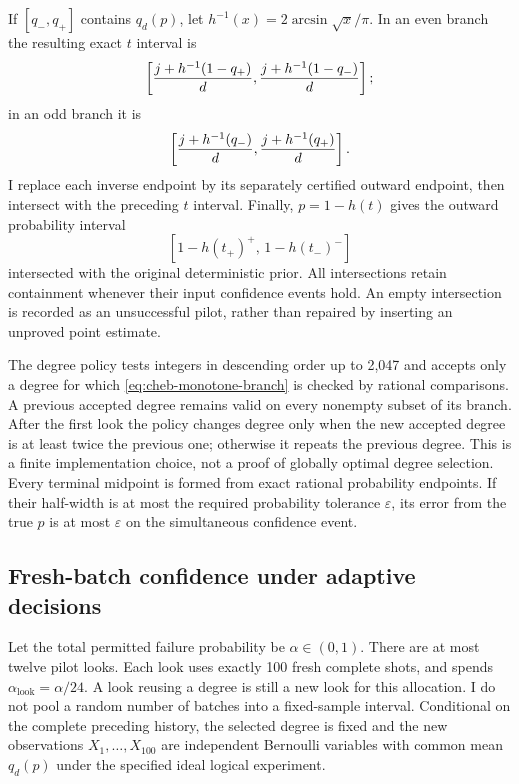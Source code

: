 \documentclass[11pt]{article}
\begin{document}
If $[q_-,q_+]$ contains $q_d(p)$, let $h^{-1}(x)=
2\arcsin\sqrt x/\pi$. In an even branch the resulting exact $t$
interval is
\[
 \left[{j+h^{-1}(1-q_+)\over d},
       {j+h^{-1}(1-q_-)\over d}\right];
\]
in an odd branch it is
\[
 \left[{j+h^{-1}(q_-)\over d},
       {j+h^{-1}(q_+)\over d}\right].
\]
I replace each inverse endpoint by its separately certified outward
endpoint, then intersect with the preceding $t$ interval. Finally,
$p=1-h(t)$ gives the outward probability interval
\[
 [1-h(t_+)^{+},\,1-h(t_-)^{-}]
\]
intersected with the original deterministic prior. All intersections
retain containment whenever their input confidence events hold. An empty
intersection is recorded as an unsuccessful pilot, rather than repaired
by inserting an unproved point estimate.

The degree policy tests integers in descending order up to 2,047 and
accepts only a degree for which \eqref{eq:cheb-monotone-branch} is checked
by rational comparisons. A previous accepted degree remains valid on
every nonempty subset of its branch. After the first look the policy
changes degree only when the new accepted degree is at least twice the
previous one; otherwise it repeats the previous degree. This is a finite
implementation choice, not a proof of globally optimal degree selection.
Every terminal midpoint is formed from exact rational probability
endpoints. If their half-width is at most the required probability
tolerance $\varepsilon$, its error from the true $p$ is at most
$\varepsilon$ on the simultaneous confidence event.

\subsection{Fresh-batch confidence under adaptive decisions}

Let the total permitted failure probability be $\alpha\in(0,1)$.
There are at most twelve pilot looks. Each look uses exactly 100 fresh
complete shots, and spends $\alpha_{
\mathrm{look}}=\alpha/24$. A look reusing a degree is still a new look
for this allocation. I do not pool a random number of batches into a
fixed-sample interval. Conditional on the complete preceding history,
the selected degree is fixed and the new observations $X_1,\ldots,X_{100}$
are independent Bernoulli variables with common mean $q_d(p)$ under the
specified ideal logical experiment.
\end{document}
